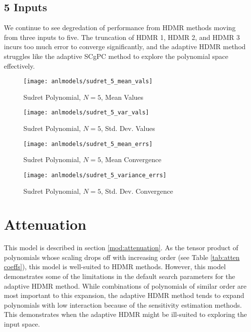 \subsection{5 Inputs}
We continue to see degredation of performance from HDMR methods moving from three inputs to five.  The
truncation of HDMR 1, HDMR 2, and HDMR 3 incurs too much error to converge significantly, and the adaptive
HDMR method struggles like the adaptive SCgPC method to explore the polynomial space effectively.  
\begin{figure}[H]
  \centering
  \texttt{[image: anlmodels/sudret\_5\_mean\_vals]}
  \caption{Sudret Polynomial, $N=5$, Mean Values}
  \label{fig:sudretpoly mean values 5}
\end{figure}
\begin{figure}[H]
  \centering
  \texttt{[image: anlmodels/sudret\_5\_var\_vals]}
  \caption{Sudret Polynomial, $N=5$, Std. Dev. Values}
  \label{fig:sudretpoly var values 5}
\end{figure}

\begin{figure}[H]
  \centering
  \texttt{[image: anlmodels/sudret\_5\_mean\_errs]}
  \caption{Sudret Polynomial, $N=5$, Mean Convergence}
  \label{fig:sudretpoly mean errors 5}
\end{figure}
\begin{figure}[H]
  \centering
  \texttt{[image: anlmodels/sudret\_5\_variance\_errs]}
  \caption{Sudret Polynomial, $N=5$, Std. Dev. Convergence}
  \label{fig:sudretpoly var errors 5}
\end{figure}


\section{Attenuation}
This model is described in section \ref{mod:attenuation}.  As the tensor product of polynomials whose scaling
drops off with increasing order (see Table \ref{tab:atten coeffs}), this model is well-suited to HDMR methods.
However, this model demonstrates some of the limitations in the default search parameters for the adaptive
HDMR method.  While combinations of polynomials of similar order are most important to this expansion, the
adaptive HDMR method tends to expand polynomials with low interaction because of the sensitivity estimation
methods.  This demonstrates when the adaptive HDMR might be ill-suited to exploring the input space.

